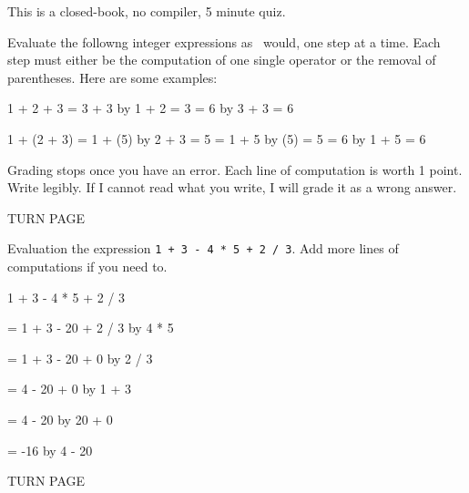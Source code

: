 

This is a closed-book, no compiler, 5 minute quiz.

Evaluate the followng integer expressions as \cpp\ would, one step at a
time.
Each step must either be the computation of one single operator
or the removal of parentheses.
Here are some examples:
\begin{console}
1 + 2 + 3
= 3 + 3          by 1 + 2 = 3
= 6              by 3 + 3 = 6
\end{console}
\begin{console}
1 + (2 + 3)
= 1 + (5)        by 2 + 3 = 5
= 1 + 5          by (5) = 5
= 6              by 1 + 5 = 6
\end{console}

Grading stops once you have an error.
Each line of computation is worth 1 point.
Write legibly.
If I cannot read what you write, I will grade it as a wrong answer.

TURN PAGE

\newpage
\nextq
Evaluation the expression \verb!1 + 3 - 4 * 5 + 2 / 3!.
Add more lines of computations if you need to.
\\
\ANSWER
\begin{answercode}
1 + 3 - 4 * 5 + 2 / 3

= 1 + 3 - 20 + 2 / 3                                 by 4 * 5

= 1 + 3 - 20 + 0                                    by 2 / 3

= 4 - 20 + 0                                        by 1 + 3

= 4 - 20                                            by 20 + 0

= -16                                               by 4 - 20

\end{answercode}

TURN PAGE

